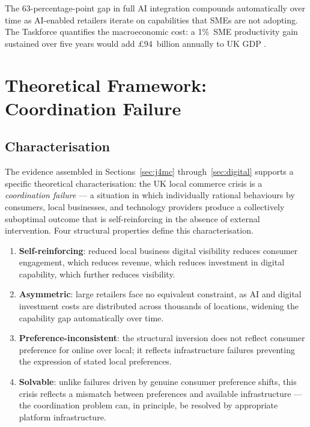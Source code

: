 \documentclass[12pt,a4paper]{article}
\begin{document}
The 63-percentage-point gap in full AI integration compounds automatically over time as
AI-enabled retailers iterate on capabilities that SMEs are not adopting. The Taskforce
quantifies the macroeconomic cost: a 1\%~SME productivity gain sustained over five years
would add \pounds94~billion annually to UK GDP \citep{DBT2025}.


\section{Theoretical Framework: Coordination Failure}
\label{sec:framework}

\subsection{Characterisation}

The evidence assembled in Sections~\ref{sec:j4mc} through~\ref{sec:digital} supports a
specific theoretical characterisation: the UK local commerce crisis is a
\emph{coordination failure} --- a situation in which individually rational behaviours by
consumers, local businesses, and technology providers produce a collectively suboptimal
outcome that is self-reinforcing in the absence of external intervention. Four structural
properties define this characterisation.

\begin{enumerate}[leftmargin=*, label=(\roman*)]
\item \textbf{Self-reinforcing}: reduced local business digital visibility reduces consumer
  engagement, which reduces revenue, which reduces investment in digital capability, which
  further reduces visibility.
\item \textbf{Asymmetric}: large retailers face no equivalent constraint, as AI and digital
  investment costs are distributed across thousands of locations, widening the capability
  gap automatically over time.
\item \textbf{Preference-inconsistent}: the structural inversion does not reflect consumer
  preference for online over local; it reflects infrastructure failures preventing the
  expression of stated local preferences.
\item \textbf{Solvable}: unlike failures driven by genuine consumer preference shifts, this
  crisis reflects a mismatch between preferences and available infrastructure --- the
  coordination problem can, in principle, be resolved by appropriate platform infrastructure.
\end{enumerate}
\end{document}
